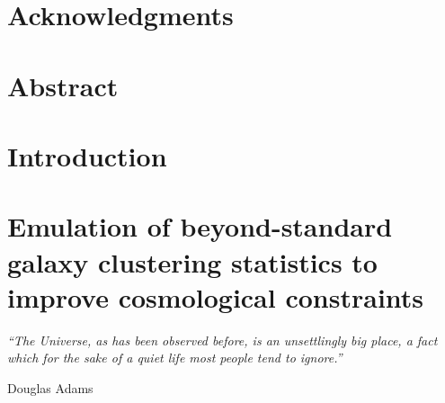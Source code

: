 \documentclass[12pt,oneside,letterpaper]{report}
\begin{document}
\chapter*{Acknowledgments}


\newpage


\chapter*{Abstract}



\newpage


\tableofcontents


\cleardoublepage
{}
{}
\listoffigures
\newpage


\cleardoublepage
{}
{}
\listoftables
\newpage





\setcounter{chapter}{-1}

\chapter{Introduction}
\setcounter{section}{-1}
\label{chp:introduction}


\chapter{Emulation of beyond-standard galaxy clustering statistics to improve cosmological constraints}
\setcounter{section}{-1}
\label{chp:aemulus}
\epigraph{\emph{``The Universe, as has been observed before, is an unsettlingly big place, a fact which for the sake of a quiet life most people tend to ignore.''}}{\vspace{1em}{\emdash}Douglas Adams}

\end{document}
